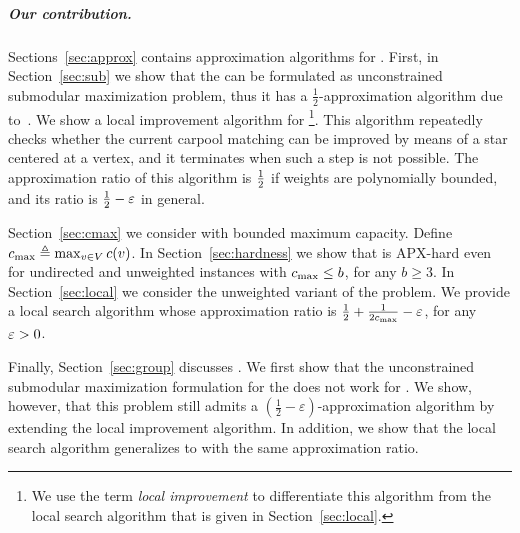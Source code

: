 
\subparagraph{Our contribution.}
%
Sections~\ref{sec:approx} contains approximation algorithms
for \carpool.  First, in Section~\ref{sec:sub} we show that
the \carpool can be formulated as unconstrained submodular
maximization problem, thus it has a $\frac{1}{2}$-approximation
algorithm due to~\cite{BFNS15,buchbinder2016deterministic}.
%
We show a local improvement algorithm for \carpool%
\footnote{We use the term \emph{local improvement} to differentiate
this algorithm from the local search algorithm that is given in
Section~\ref{sec:local}.}.
%
This algorithm repeatedly checks whether the current carpool matching
can be improved by means of a star centered at a vertex, and it
terminates when such a step is not possible.
%
The approximation ratio of this algorithm is $\frac{1}{2}$ if weights are
polynomially bounded, and its ratio is $\frac{1}{2}-\varepsilon$ in general.

Section~\ref{sec:cmax} we consider \carpool with bounded maximum
capacity.   Define $c_{\max} \triangleq \max_{v \in V} c(v)$.
%
In Section~\ref{sec:hardness} we show that \carpool is APX-hard even
for undirected and unweighted instances with $c_{\max} \leq b$, for any
$b \geq 3$.
%
In Section~\ref{sec:local} we consider the unweighted variant of the
problem.  We provide a local search algorithm whose approximation
ratio is $\frac{1}{2} + \frac{1}{2c_{\max}} - \varepsilon$, for any $\varepsilon>0$.


Finally, Section~\ref{sec:group} discusses \gcp.  We first show that
the unconstrained submodular maximization formulation for the \carpool
does not work for \gcp.  We show, however, that this problem still
admits a $(\frac{1}{2} -\varepsilon)$-approximation algorithm by
extending the local improvement algorithm.  In addition, we show that
the local search algorithm generalizes to \gcp with the same
approximation ratio.
